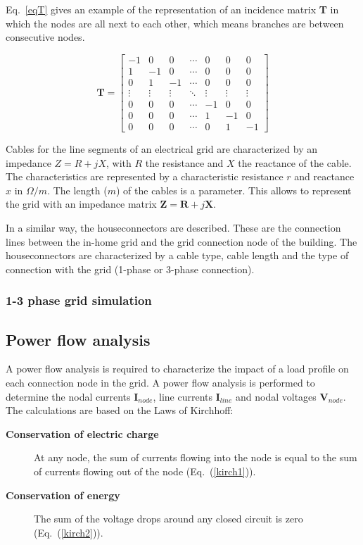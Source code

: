 Eq.~\ref{eqT} gives an example of the representation of an incidence matrix \textbf{T} in which the nodes are all next to each other, which means branches are between
consecutive nodes.

\begin{equation}
\textbf{T} = \begin{bmatrix}
-1 & 0 & 0 & \cdots & 0 & 0 & 0\\
1 & -1 & 0 & \cdots & 0 & 0 & 0\\
0 & 1 & -1 & \cdots & 0 & 0 & 0\\
\vdots & \vdots & \vdots & \ddots & \vdots & \vdots & \vdots\\
0 & 0 & 0 & \cdots & -1 & 0 & 0\\
0 & 0 & 0 & \cdots & 1 & -1 & 0\\
0 & 0 & 0 & \cdots & 0 & 1 & -1
\end{bmatrix}
\label{eqT}
\end{equation}

Cables for the line segments of an electrical grid are characterized by an impedance $Z = R + jX$, with $R$ the resistance and $X$ the reactance of the cable. The characteristics are represented by a characteristic resistance $r$ and reactance $x$ in $\Omega /m$. The length ($m$) of the cables is a parameter. This allows to represent the grid with an impedance matrix $\textbf{Z} = \textbf{R} + j \textbf{X}$.

In a similar way, the houseconnectors are described. These are the connection lines between the in-home grid and the grid connection node of the building. The houseconnectors are characterized by a cable type, cable length and the type of connection with the grid (\mbox{1-phase} or 3-phase connection).

\subsubsection{1-3 phase grid simulation}

\subsection{Power flow analysis}
A power flow analysis is required to characterize the impact of a load profile on each connection node in the grid. A power flow analysis is performed to determine the nodal currents $\textbf{I}_{node}$, line currents $\textbf{I}_{line}$ and nodal voltages $\textbf{V}_{node}$. The calculations are based on the Laws of Kirchhoff:
\begin{description}
\item[\textbf{Conservation of electric charge}] At any node, the sum of currents flowing into the node is equal to the sum of currents flowing out of the node (Eq.~(\ref{kirch1})).
\item[\textbf{Conservation of energy}] The sum of the voltage drops around any closed circuit is zero (Eq.~(\ref{kirch2})).
\end{description}

